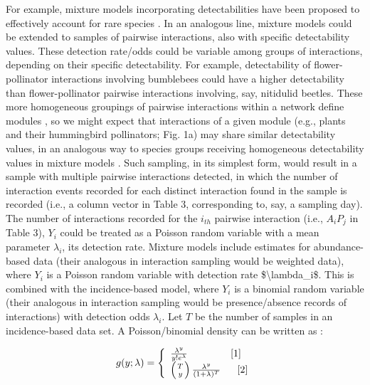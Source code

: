 \documentclass[12pt]{article}
\begin{document}

For example, mixture models incorporating detectabilities have been proposed to effectively account for rare species \citep{Mao:2005tka}. In an analogous line, mixture models could be extended to samples of pairwise interactions, also with specific detectability values. These detection rate\slash odds could be variable among groups of interactions, depending on their specific detectability. For example, detectability of flower-pollinator interactions involving bumblebees could have a higher detectability than flower-pollinator pairwise interactions involving, say, nitidulid beetles. These more homogeneous groupings of pairwise interactions within a network define modules \citep{Bascompte:2014to}, so we might expect that interactions of a given module (e.g., plants and their hummingbird pollinators; Fig. 1a) may share similar detectability values, in an analogous way to species groups receiving homogeneous detectability values in mixture models \citep{Mao:2005tka}. Such sampling, in its simplest form, would result in a sample with multiple pairwise interactions detected, in which the number of interaction events recorded for each distinct interaction found in the sample is recorded (i.e., a column vector in Table 3, corresponding to, say, a sampling day). The number of interactions recorded for the $i_{th}$ pairwise interaction (i.e., $A_iP_j$ in Table 3), $Y_i$ could be treated as a Poisson random variable with a mean parameter $\lambda_i$, its detection rate. Mixture models \citep{Mao:2005tka} include estimates for abundance-based data (their analogous in interaction sampling would be weighted data), where $Y_i$ is a Poisson random variable with detection rate \$\textbackslash{}lambda\_i\$. This is combined with the incidence-based model, where $Y_i$ is a binomial random variable (their analogous in interaction sampling would be presence\slash absence records of interactions) with detection odds $\lambda_i$. Let $T$ be the number of samples in an incidence-based data set. A Poisson\slash binomial density can be written as \citep{Mao:2005tka}:

\[ 
g(y;\lambda) =  \left\{
\begin{array}{ll}
\frac{\lambda^y}{y!e^{\lambda}} \ \ \ \ \ \ \ \ \ \ \ \ \  [1]\\
\left({T\above 0pt y}\right) \frac{\lambda^y}{(1+\lambda)^T} \ \ \ \ \ [2]
\end{array}%
\right.
\]
\end{document}
